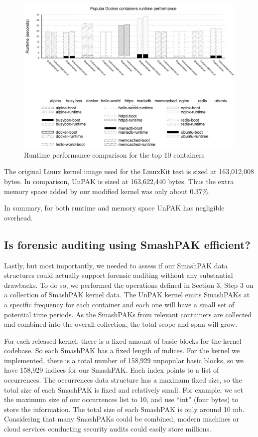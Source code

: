 \begin{figure}
\centering
\includegraphics[width=1.5\columnwidth]{diagram/performance.png}
\caption{\small Runtime performance comparison for the top 10 containers}
\label{fig:performance}
\end{figure}

The original Linux kernel image used for the LinuxKit test  is sized at 163,012,008 bytes. In comparison, UnPAK is sized at 163,622,440 bytes. 
Thus the extra memory space added by our modified kernel was only about 0.37\%. 

In summary, for both runtime and memory space UnPAK has negligible overhead.

\subsection{Is forensic auditing using SmashPAK efficient?}
\label{sec.evaluation.5} 
Lastly, but most importantly, we needed to assess if our SmashPAK data structures could actually support  forensic auditing without any substantial drawbacks. 
To do so, we performed the  operations defined in Section 3, Step 3 on a collection of SmashPAK kernel data. 
The UnPAK kernel emits SmashPAKs at a specific frequency for each container and each one will have a small set of potential time periods.  
As the SmashPAKs from relevant containers are collected and combined into the overall collection, the total scope and span will grow. 

For each released kernel, there is a fixed amount of basic blocks for the kernel codebase. So each SmashPAK has a fixed length of indices. 
For the kernel we implemented, there is a total number of 158,929 unpopular basic blocks, so we have 158,929 indices for our SmashPAK. 
Each index points to a list of occurrences. The occurrences data structure has a maximum fixed size, so the total size of each SmashPAK is fixed and relatively small. 
For example, we set the maximum size of our occurrences list to 10, and use ``int'' (four bytes) to store the information. 
The total size of each SmashPAK is only around 10 mb. Considering that many SmashPAKs could be combined, 
modern machines or cloud services conducting security audits could easily store millions. 

